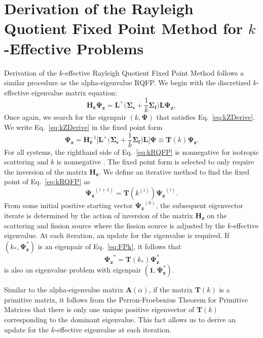 \section{Derivation of the Rayleigh Quotient Fixed Point Method for $k$-Effective Problems}

Derivation of the $k$-effective Rayleigh Quotient Fixed Point Method follows a similar procedure as the alpha-eigenvalue RQFP. We begin with the discretized $k$-effective eigenvalue matrix equation:
\begin{equation}
	\mathbf{H_{z}} \mathbf{\Psi_{z}} = \mathbf{L}^{+} \bigg ( \mathbf{\Sigma_{s}} + \frac{1}{k}\mathbf{\Sigma_{f}} \bigg ) \mathbf{L} \mathbf{\Psi_{z}},
	\label{eq:kZDerive}
\end{equation}
Once again, we search for the eigenpair $(k, \mathbf{\Psi})$ that satisfies Eq.~\ref{eq:kZDerive}. We write Eq.~\ref{eq:kZDerive} in the fixed point form
\begin{equation}
	\mathbf{\Psi_{z}} = \mathbf{H}^{-1}_{\mathbf{z}} \bigg [ \mathbf{L}^{+} \bigg ( \mathbf{\Sigma_{s}} + \frac{1}{k} \mathbf{\Sigma_{f}} \bigg ) \mathbf{L} \bigg ] \mathbf{\Psi} \equiv \mathbf{T}(k) \mathbf{\Psi_{z}}.
	\label{eq:kRQFP}
\end{equation}
For all systems, the righthand side of Eq.~\ref{eq:kRQFP} is nonnegative for isotropic scattering and $k$ is nonnegative \cite{warsa_krylov_2004}. The fixed point form is selected to only require the inversion of the matrix $\mathbf{H}_{\mathbf{z}}$.
We define an iterative method to find the fixed point of Eq.~\ref{eq:kRQFP} as
\begin{equation}
	\mathbf{\Psi_{z}}^{(i+1)} = \mathbf{T}(k^{(i)}) \mathbf{\Psi_{z}}^{(i)}.
	\label{eq:FPk}
\end{equation}
From some initial positive starting vector $\mathbf{\Psi_{z}}^{(0)}$, the subsequent eigenvector iterate is determined by the action of inversion of the matrix $\mathbf{H_{z}}$ on the scattering and fission source where the fission source is adjusted by the $k$-effective eigenvalue. At each iteration, an update for the eigenvalue is required. If $(k_{*},\mathbf{\Psi}_\mathbf{z}^{*})$ is an eigenpair of Eq.~\ref{eq:FPk}, it follows that
\begin{equation}
	\mathbf{\Psi_{z}}^{*} = \mathbf{T}(k_{*}) \mathbf{\Psi}_\mathbf{z}^{*}
\end{equation}
is also an eigenvalue problem with eigenpair $(\mathbf{1},\mathbf{\Psi}_\mathbf{z}^{*})$.

Similar to the alpha-eigenvalue matrix $\mathbf{A}(\alpha)$, if the matrix $\mathbf{T}(k)$ is a primitive matrix, it follows from the Perron-Froebenius Theorem for Primitive Matrices that there is only one unique positive eigenvector of $\mathbf{T}(k)$ corresponding to the dominant eigenvalue. This fact allows us to derive an update for the $k$-effective eigenvalue at each iteration.

